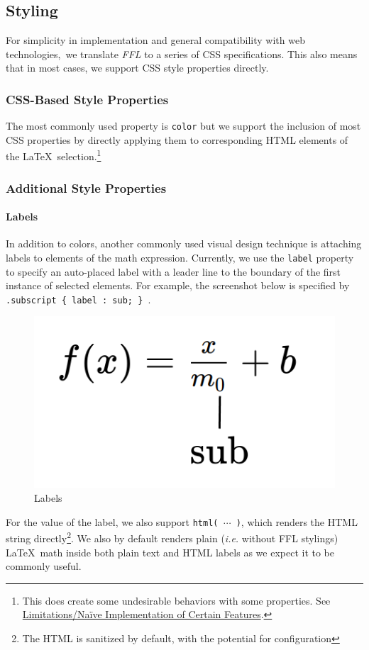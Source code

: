 \documentclass{article}
\begin{document}
\begin{multicols*}{2}
  \subsection*{Styling}
  For simplicity in implementation and general compatibility with web technologies,\
  we translate \textit{FFL} to a series of CSS specifications. This also means that
  in most cases, we support CSS style properties directly.
  \subsubsection*{CSS-Based Style Properties}
  The most commonly used property is \texttt{color} but we support the inclusion of
  most CSS properties by directly applying them to corresponding HTML elements
  of the \LaTeX\ selection.\footnote{This does create some undesirable behaviors
    with some properties. See \href{limitations}{Limitations/Naïve Implementation of Certain Features}.}
  \subsubsection*{Additional Style Properties}
  \paragraph*{Labels}
  In addition to colors, another commonly used visual design technique is attaching
  labels to elements of the math expression.
  Currently, we use the \texttt{label} property to specify an auto-placed label with
  a leader line to the boundary of the first instance of selected elements. For example,
  the screenshot below is specified by \texttt{.subscript \{ label : sub; \} }.
  \begin{figure}[H]
    \begin{center}
      \includegraphics[width=0.5\columnwidth]{label.png}
    \end{center}\vspace*{-1em}
    \caption{Labels}
  \end{figure}
  For the value of the label, we also support \texttt{html( $\cdots$ )}, which
  renders the HTML string directly\footnote{The HTML is sanitized by default, with the potential for configuration}.
  We also by default renders plain (\emph{i.e.} without FFL stylings) \LaTeX\ math inside
  both plain text and HTML labels as we expect it to be commonly useful.

\end{multicols*}
\end{document}
